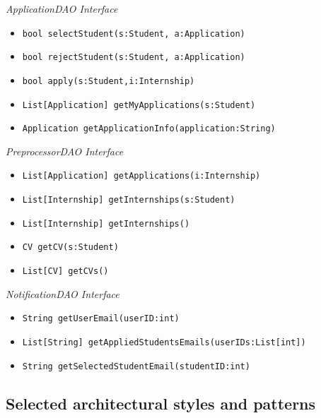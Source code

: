 \documentclass{article}
\begin{document}
\begin{flushleft}
    \textit{ApplicationDAO Interface}
\end{flushleft}

\begin{itemize}
    \item \texttt{bool selectStudent(s:Student, a:Application)}
    \item \texttt{bool rejectStudent(s:Student, a:Application)}
    \item \texttt{bool apply(s:Student,i:Internship)}
    \item \texttt{List[Application] getMyApplications(s:Student)}
    \item \texttt{Application getApplicationInfo(application:String)}
\end{itemize}

\begin{flushleft}
    \textit{PreprocessorDAO Interface}
\end{flushleft}

\begin{itemize}
    \item \texttt{List[Application] getApplications(i:Internship)}
    \item \texttt{List[Internship] getInternships(s:Student)}
    \item \texttt{List[Internship] getInternships()}
    \item \texttt{CV getCV(s:Student)}
    \item \texttt{List[CV] getCVs()}
\end{itemize}

\begin{flushleft}
    \textit{NotificationDAO Interface}
\end{flushleft}

\begin{itemize}
    \item \texttt{String getUserEmail(userID:int)}
    \item \texttt{List[String] getAppliedStudentsEmails(userIDs:List[int])}
    \item \texttt{String getSelectedStudentEmail(studentID:int)}
\end{itemize}

\newpage

\subsection{Selected architectural styles and patterns}
\end{document}
